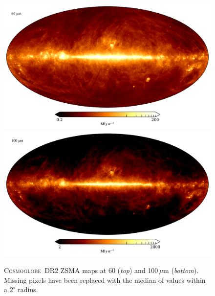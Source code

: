 \documentclass{aa}
\newcommand{\cosmoglobe}{\textsc{Cosmoglobe}}
\begin{document}
\begin{figure}
	\centering
	\includegraphics[width=0.96\linewidth]{figs/map_07.pdf}\\
	\includegraphics[width=0.96\linewidth]{figs/map_08.pdf}
	\caption{\cosmoglobe\ DR2 ZSMA maps at 60 (\emph{top}) and
          100$\,\mu$m (\emph{bottom}). Missing pixels have been replaced with
          the median of values within a $2^\circ$ radius.}
	\label{fig:freqmaps7_8}
\end{figure}
\end{document}
